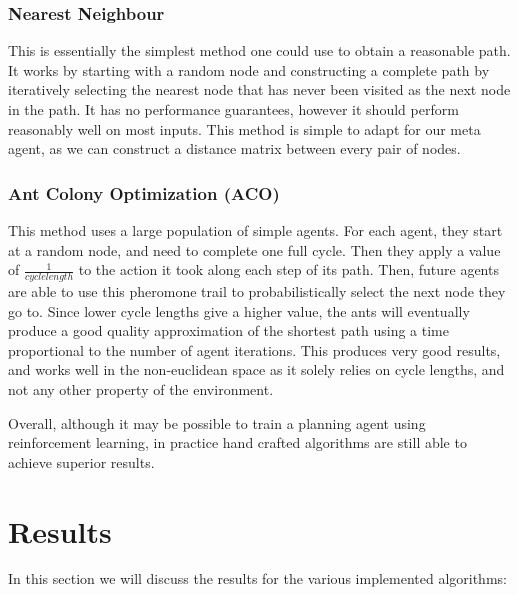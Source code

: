 \documentclass{article}
\begin{document}
    \subsubsection{Nearest Neighbour}
    \label{nearest_neighbour}
    This is essentially the simplest method one could use to obtain a reasonable path. It works by starting with a random node and constructing a complete path by iteratively selecting the nearest node that has never been visited as the next node in the path. It has no performance guarantees, however it should perform reasonably well on most inputs. This method is simple to adapt for our meta agent, as we can construct a distance matrix between every pair of nodes.
    
    \subsubsection{Ant Colony Optimization (ACO)}
    \label{aco}
    This method uses a large population of simple agents. For each agent, they start at a random node, and need to complete one full cycle. Then they apply a value of $\frac{1}{cycle length}$ to the action it took along each step of its path. Then, future agents are able to use this pheromone trail to probabilistically select the next node they go to. Since lower cycle lengths give a higher value, the ants will eventually produce a good quality approximation of the shortest path using a time proportional to the number of agent iterations. This produces very good results, and works well in the non-euclidean space as it solely relies on cycle lengths, and not any other property of the environment.
    
    Overall, although it may be possible to train a planning agent using reinforcement learning, in practice hand crafted algorithms are still able to achieve superior results.

    \section{Results}
    \label{results}
    In this section we will discuss the results for the various implemented algorithms:
    
\end{document}
